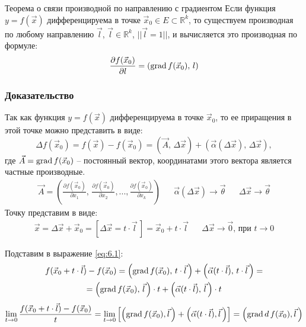 \begin{tbox}{Теорема о связи производной по направлению с градиентом}
	Если функция $y = f(\vec{x})$ дифференцируема в точке $\vec{x}_0 \in E \subset \mathbb{R}^k$, то существуем производная по любому направлению $\vec{l}$, $\vec{l} \in \mathbb{R}^k$, $||\vec{l} = 1||$, и вычисляется это производная по формуле:
	\begin{equation*}
		\frac{\partial f(\vec{x}_0)}{\partial l} = (\operatorname{grad} f(\vec{x}_0), \, l)
	\end{equation*}
	\subsubsection*{Доказательство}

	Так как функция $y = f(\vec{x})$ дифференцируема в точке $\vec{x}_0$, то ее приращения в этой точке можно представить в виде:
	\begin{equation} \label{eq:6.1}
		\Delta f(\vec{x}_0) = f(\vec{x}) - f(\vec{x}_0) = \left(\vec{A}, \, \Delta \vec{x}\right) + \left(\vec{\alpha}(\Delta \vec{x}), \, \Delta \vec{x}\right),
	\end{equation}
	где $\vec{A} = \operatorname{grad} f(\vec{x}_0)$ -- постоянный вектор, координатами этого вектора является частные производные.
	\begin{equation*}
		\begin{aligned}
			\vec{A} = \left(\frac{\partial f(\vec{x}_0)}{\partial x_1}, \, \frac{\partial f(\vec{x}_0)}{\partial x_2}, ..., \frac{\partial f(\vec{x}_0)}{\partial x_k}\right) && \vec{\alpha}(\Delta \vec{x}) \to \vec{\theta} && \Delta \vec{x} \to \vec{\theta}
		\end{aligned}
	\end{equation*}
	Точку представим в виде:
	\begin{align*}
		\vec{x} = \Delta \vec{x} + \vec{x}_0 = \left[\Delta \vec{x} = t \cdot \vec{l}\,\right] = \vec{x}_0 + t \cdot \vec{l} && \Delta \vec{x} \to \vec{0} \text{, при }t \to 0
	\end{align*}

	Подставим в выражение \cref{eq:6.1}:
	\begin{multline*}
		f(\vec{x}_0 + t \cdot \vec{l}) - f(\vec{x}_0) = \left(\operatorname{grad} f(\vec{x}_0), \, t \cdot \vec{l}\,\right) + \left(\vec{\alpha}(t \cdot \vec{l}), \, t \cdot \vec{l}\,\right) = \\= \left(\operatorname{grad} f(\vec{x}_0), \, \vec{l} \,\right) \cdot t + \left(\vec{\alpha}(t \cdot \vec{l}), \, \vec{l}\,\right) \cdot t
	\end{multline*}
	\[\lim_{t \to 0} \frac{f(\vec{x}_0 + t \cdot \vec{l}) - f(\vec{x}_0)}{t} = \lim_{t \to 0} \left[\left(\operatorname{grad} f(\vec{x}_0), \vec{l}\,\right) + \left(\vec{\alpha}(t \cdot \vec{l}), \vec{l}\,\right)\right] = \left(\operatorname{grad} d \, f(\vec{x}_0), \vec{l}\,\right)\]
\end{tbox}

